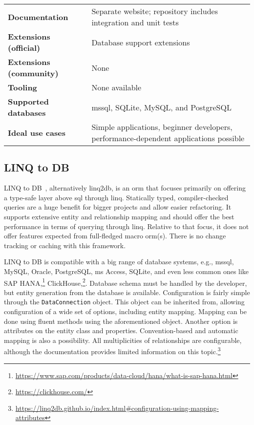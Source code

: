 {\begin{landscape}
\begin{table}[p]
\begin{tabular}{
>{\raggedright\arraybackslash}p{40.00mm}
>{\arraybackslash}p{150.00mm}
}
\textbf{Documentation} & Separate website; repository includes integration and unit tests\\
\textbf{Extensions (official)} & Database support extensions \\
\textbf{Extensions (community)} & None \\
\textbf{Tooling} & None available \\
\textbf{Supported databases} & \acrshort{mssql}, SQLite, MySQL, and PostgreSQL \\
\textbf{Ideal use cases} & Simple applications, beginner developers, performance-dependent applications possible \\
\bottomrule
\end{tabular}
\end{table}
\end{landscape}
}

\subsection{LINQ to DB}
\label{section:linqToDb}

LINQ to DB~\cite{linq2db, linq2dbRepo}, alternatively linq2db, is an \acrshort{orm} that focuses primarily on offering a type-safe layer above \acrshort{sql} through \acrshort{linq}. Statically typed, compiler-checked queries are a huge benefit for bigger projects and allow easier refactoring. It supports extensive entity and relationship mapping and should offer the best performance in terms of querying through \acrshort{linq}. Relative to that focus, it does not offer features expected from full-fledged macro \acrshort{orm}(s). There is no change tracking or caching with this framework.

LINQ to DB is compatible with a big range of database systems, e.g., \acrshort{mssql}, MySQL, Oracle, PostgreSQL, \acrshort{ms} Access, SQLite, and even less common ones like SAP HANA,\footnote{\url{https://www.sap.com/products/data-cloud/hana/what-is-sap-hana.html}} ClickHouse,\footnote{\url{https://clickhouse.com/}}. Database schema must be handled by the developer, but entity generation from the database is available. Configuration is fairly simple through the \texttt{DataConnection} object. This object can be inherited from, allowing configuration of a wide set of options, including entity mapping. Mapping can be done using fluent methods using the aforementioned object. Another option is attributes on the entity class and properties. Convention-based and automatic mapping is also a possibility. All multiplicities of relationships are configurable, although the documentation provides limited information on this topic.\footnote{\url{https://linq2db.github.io/index.html\#configuration-using-mapping-attributes}}

